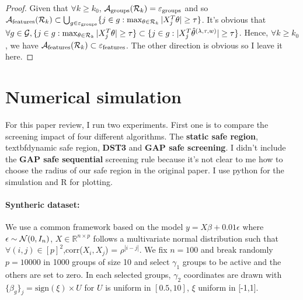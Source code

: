 \documentclass{article}
\def\real{\mathbb{R}}
\def\cG{{\cal G}}
\def\ca{{\cal A}}
\def\cR{{\cal R}}
\def\cep{{\cal \varepsilon}}
\begin{document}
\begin{proof}
Given that $\forall k \geq k_0$, $\ca_{\text{groups}}(\cR_k) = \cep_{\text{groups}}$ and so $\ca_{\text{features}}(\cR_k) \subset \bigcup_{g \in \cep_{\text{groups}}} \{j \in g: \max_{\theta \in \cR_k}|X_j^T \theta| \geq \tau\}$. It's obvious that $\forall g \in \cG, \{j \in g: \max_{\theta \in \cR_k} |X_j^T \theta| \geq \tau \} \subset \{j \in g: |X_j^T \hat{\theta}^{(\lambda,\tau,w)}| \geq \tau \}$. Hence, $\forall k \geq k_0$, we have $\ca_{\text{features}}(\cR_k) \subset \cep_{\text{features}}$.  The other direction is obvious so I leave it here. 
\end{proof}

\section{Numerical simulation}
For this paper review, I run two experiments. First one is to compare the screening impact of four different algorithms. The \textbf{static safe region}, textbf{dynamic safe region},  \textbf{DST3} and \textbf{GAP safe screening}. I didn't include the \textbf{GAP safe sequential} screening rule because it's not clear to me how to choose the radius of our safe region in the original paper. I use python for the simulation and R for plotting. 

\paragraph{Syntheric dataset:}  We use a common framework based on the model $y = X\beta + 0.01\epsilon$ where $\epsilon \sim {\cal N}(0,I_n)$, $X \in \real^{n \times p}$ follows a multivariate normal distribution such that $\forall (i,j) \in [p]^2$,corr($X_i,X_j$) = $\rho^{|i-j|}$. We fix $n = 100$ and break randomly $p = 10000$ in 1000 groups of size 10 and select $\gamma_1$ groups to be active and the others are set to zero.  In each selected groups, $\gamma_2$ coordinates are drawn with $\{\beta_g\}_j = \text{sign}(\xi) \times U$ for $U$ is uniform in $[0.5,10]$, $\xi$ uniform in [-1,1]. 
\end{document}
